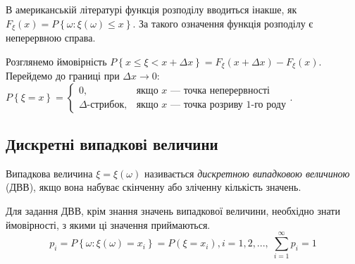 \begin{remark}
    В американській літературі функція розподілу вводиться інакше,
    як $F_\xi (x) = P\left\{\omega:\xi(\omega) \leq x\right\}$.
    За такого означення функція розподілу є неперервною справа.
\end{remark}

Розглянемо ймовірність $P\left\{x \leq \xi < x + \Delta x\right\} = F_\xi (x+\Delta x) - F_\xi (x)$.
Перейдемо до границі при $\Delta x \rightarrow 0$:
$P\left\{ \xi = x\right\} = \begin{cases}
    0, & \text{якщо } x \text{ --- точка неперервності} \\
    \Delta \text{-стрибок}, & \text{якщо } x \text{ --- точка розриву 1-го роду}
\end{cases}$.

\subsection{Дискретні випадкові величини}
\begin{definition}
    Випадкова величина $\xi = \xi(\omega)$ називається 
    \emph{дискретною випадковою величиною} (ДВВ), якщо вона набуває скінченну або зліченну 
    кількість значень.
\end{definition}
Для задання ДВВ, крім знання значень випадкової величини, необхідно знати ймовірності, 
з якими ці значення приймаються.
$$p_i = P\left\{\omega: \xi(\omega) = x_i\right\} = P(\xi = x_i), i = 1,2,... , \; \sum\limits_{i=1}^\infty p_i = 1$$

